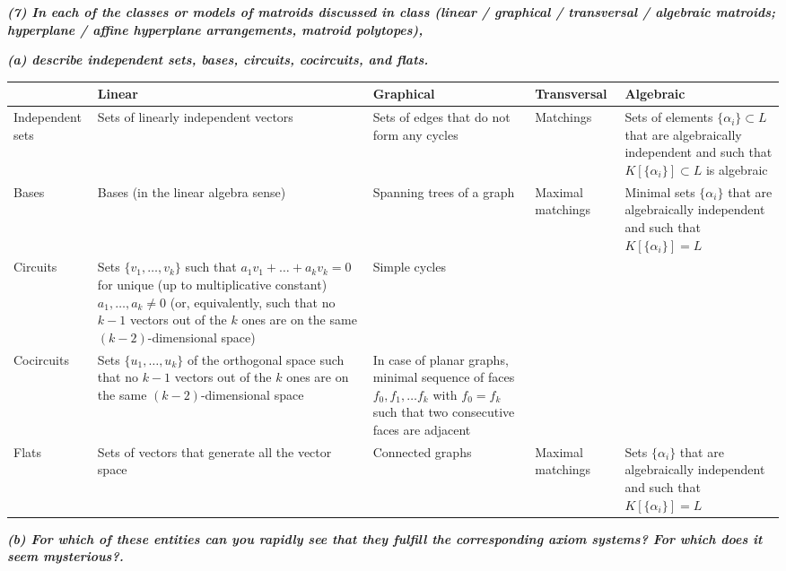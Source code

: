 \textbf{\textit{(7) In each of the classes or models of matroids discussed in class (linear / graphical / transversal / algebraic matroids; hyperplane / affine hyperplane arrangements, matroid polytopes),}}

\hspace{5pt}\textbf{\textit{(a) describe independent sets, bases, circuits, cocircuits, and flats.}}

\vspace{3pt}

\begin{tabularx}{\textwidth}{X|X|X|X|X}
\hline
                 & Linear & Graphical & Transversal       & Algebraic   \\ \hline
Independent sets & Sets of linearly independent vectors & Sets of edges that do not form any cycles & Matchings  & Sets of elements $\{\alpha_i\} \subset L$ that are algebraically independent and such that $K[\{\alpha_i\}] \subset L$ is algebraic \\ \hline
Bases            & Bases (in the linear algebra sense) & Spanning trees of a graph & Maximal matchings & Minimal sets $\{\alpha_i\}$ that are algebraically independent and such that $K[\{\alpha_i\}] = L$ \\ \hline
Circuits         & Sets $\{v_1, \ldots, v_k\}$ such that $a_1 v_1 + \ldots + a_k v_k = 0$ for unique (up to multiplicative constant) $a_1, \ldots, a_k \neq 0$ (or, equivalently, such that no $k-1$ vectors out of the $k$ ones are on the same $(k-2)$-dimensional space) & Simple cycles &   &  \\ \hline
Cocircuits       & Sets $\{u_1, \ldots, u_k\}$ of the orthogonal space such that no $k-1$ vectors out of the $k$ ones are on the same $(k-2)$-dimensional space & In case of planar graphs, minimal sequence of faces $f_0, f_1, \ldots f_k$ with $f_0 = f_k$ such that two consecutive faces are adjacent & & \\ \hline
Flats            & Sets of vectors that generate all the vector space & Connected graphs & Maximal matchings & Sets $\{\alpha_i\}$ that are algebraically independent and such that $K[\{\alpha_i\}] = L$ \\ \hline                                                 
\end{tabularx}
\vspace{3pt}

\hspace{5pt}\textbf{\textit{(b) For which of these entities can you rapidly see that they fulfill the corresponding axiom systems?  For which does it seem mysterious?.}}

